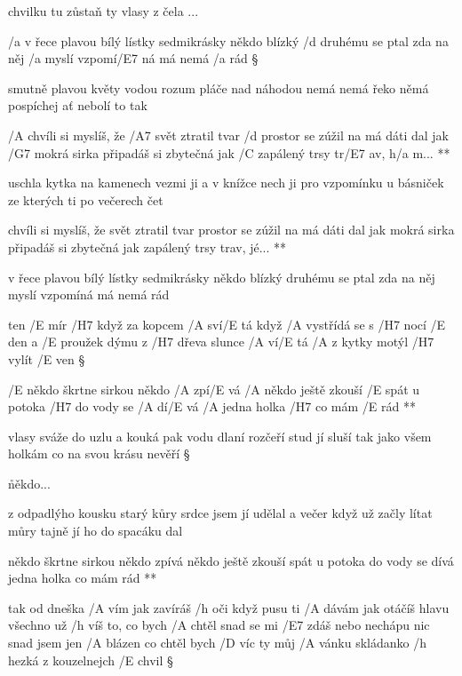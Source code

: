 chvilku tu zůstaň ty vlasy z čela ...





/a v řece plavou bílý lístky sedmikrásky někdo blízký
/d druhému se ptal zda na něj /a myslí vzpomí/E7 ná má nemá /a rád \S

smutně plavou květy vodou rozum pláče nad náhodou
nemá nemá řeko němá pospíchej ať nebolí to tak

\R /A chvíli si myslíš, že /A7 svět ztratil tvar
   /d prostor se zúžil na má dáti dal
   jak /G7 mokrá sirka připadáš si zbytečná
   jak /C zapálený trsy tr/E7 av, h/a m...  **

uschla kytka na kamenech vezmi ji a v knížce nech ji
pro vzpomínku u básniček ze kterých ti po večerech čet

\R chvíli si myslíš, že svět ztratil tvar
   prostor se zúžil na má dáti dal
   jak mokrá sirka připadáš si zbytečná
   jak zapálený trsy trav, jé... **

v řece plavou bílý lístky sedmikrásky někdo blízký
druhému se ptal zda na něj myslí vzpomíná má nemá rád \s




ten /E mír /H7 když za kopcem /A sví/E tá
když /A vystřídá se s /H7 nocí /E den
a /E proužek dýmu z /H7 dřeva slunce /A ví/E tá
/A z kytky motýl /H7 vylít /E ven \S

\R /E někdo škrtne sirkou někdo /A zpí/E vá
   /A někdo ještě zkouší /E spát
   u potoka /H7 do vody se /A dí/E vá
   /A jedna holka /H7 co mám /E rád **

vlasy sváže do uzlu a kouká
pak vodu dlaní rozčeří
stud jí sluší tak jako všem holkám
co na svou krásu nevěří \S

\r někdo...

z odpadlýho kousku starý kůry
srdce jsem jí udělal
a večer když už začly lítat můry
tajně jí ho do spacáku dal

\R někdo škrtne sirkou někdo zpívá
   někdo ještě zkouší spát
   u potoka do vody se dívá
   jedna holka co mám rád  **




tak od dneška /A vím jak zavíráš /h oči když pusu ti /A dávám
jak otáčíš hlavu všechno už /h víš to, co bych /A chtěl
snad se mi /E7 zdáš nebo nechápu nic
snad jsem jen /A blázen co chtěl bych /D víc
ty můj /A vánku skládanko /h hezká z kouzelnejch /E chvil \S

